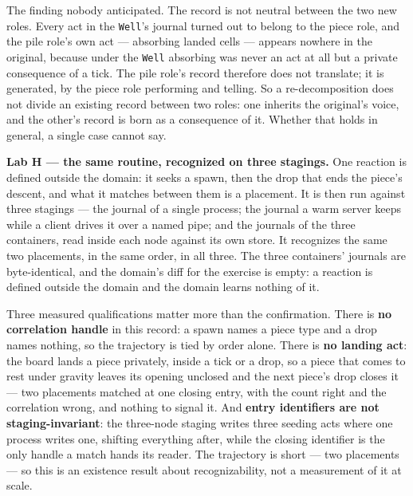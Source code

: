 \documentclass[
]{article}
\begin{document}
The finding nobody anticipated. The record is not neutral between the
two new roles. Every act in the \texttt{Well}'s journal turned out to
belong to the piece role, and the pile role's own act --- absorbing
landed cells --- appears nowhere in the original, because under the
\texttt{Well} absorbing was never an act at all but a private
consequence of a tick. The pile role's record therefore does not
translate; it is generated, by the piece role performing and telling. So
a re-decomposition does not divide an existing record between two roles:
one inherits the original's voice, and the other's record is born as a
consequence of it. Whether that holds in general, a single case cannot
say.

\textbf{Lab H --- the same routine, recognized on three stagings.} One
reaction is defined outside the domain: it seeks a spawn, then the drop
that ends the piece's descent, and what it matches between them is a
placement. It is then run against three stagings --- the journal of a
single process; the journal a warm server keeps while a client drives it
over a named pipe; and the journals of the three containers, read inside
each node against its own store. It recognizes the same two placements,
in the same order, in all three. The three containers' journals are
byte-identical, and the domain's diff for the exercise is empty: a
reaction is defined outside the domain and the domain learns nothing of
it.

Three measured qualifications matter more than the confirmation. There
is \textbf{no correlation handle} in this record: a spawn names a piece
type and a drop names nothing, so the trajectory is tied by order alone.
There is \textbf{no landing act}: the board lands a piece privately,
inside a tick or a drop, so a piece that comes to rest under gravity
leaves its opening unclosed and the next piece's drop closes it --- two
placements matched at one closing entry, with the count right and the
correlation wrong, and nothing to signal it. And \textbf{entry
identifiers are not staging-invariant}: the three-node staging writes
three seeding acts where one process writes one, shifting everything
after, while the closing identifier is the only handle a match hands its
reader. The trajectory is short --- two placements --- so this is an
existence result about recognizability, not a measurement of it at
scale.
\end{document}
